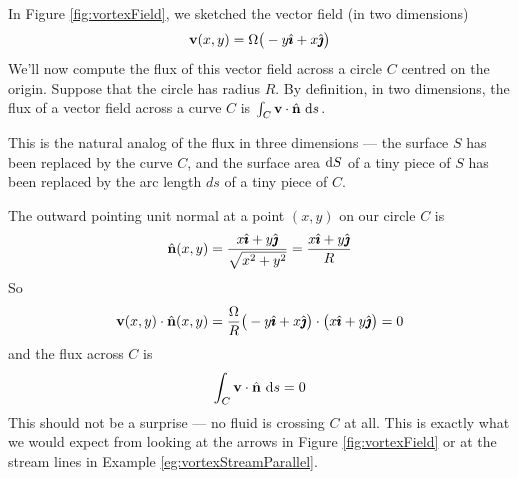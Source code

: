 \begin{eg}[Vortex]\label{eg:fluxIntegralB}
In Figure \ref{fig:vortexField}, we sketched the vector field
(in two dimensions)
\begin{equation*}
\mathbf{v}(x,y) = \Omega\big(-y\hat{\pmb{\imath}} +x\hat{\pmb{\jmath}}\big)
\end{equation*}
We'll now compute the flux of this vector field across a
circle $C$ centred on the origin. Suppose that the circle has radius $R$.
By definition, in two dimensions, the flux of a vector field across a curve
$C$ is $\int_C\mathbf{v}\cdot\hat{\mathbf{n}}\ \mathrm{d}s$. 

This is the natural analog of the
flux in three dimensions --- the surface $S$ has been replaced by the 
curve $C$, and the surface area $\mathrm{d}S$ of a tiny piece of $S$ has been
replaced by the arc length $ds$ of a tiny piece of $C$.

The outward pointing unit normal at a point $(x,y)$ on our circle $C$ is
\begin{equation*}
\hat{\mathbf{n}}(x,y) = \frac{x\hat{\pmb{\imath}} + y\hat{\pmb{\jmath}}}{\sqrt{x^2+y^2}}
= \frac{x\hat{\pmb{\imath}} + y\hat{\pmb{\jmath}}}{R}
\end{equation*}
So
\begin{equation*}
\mathbf{v}(x,y)\cdot\hat{\mathbf{n}}(x,y)
=\frac{\Omega}{R}\big(-y\hat{\pmb{\imath}} + x\hat{\pmb{\jmath}}\big)\cdot\big(x\hat{\pmb{\imath}} + y\hat{\pmb{\jmath}}\big)
=0
\end{equation*}
and the flux across $C$ is 
\begin{equation*}
\int_C\mathbf{v}\cdot\hat{\mathbf{n}}\ \mathrm{d}s=0
\end{equation*}
This should not be a surprise --- no fluid is crossing $C$ at all.
This is exactly what we would expect from looking at the arrows in
Figure \ref{fig:vortexField} or at the stream lines in Example 
\ref{eg:vortexStreamParallel}.
\end{eg}

